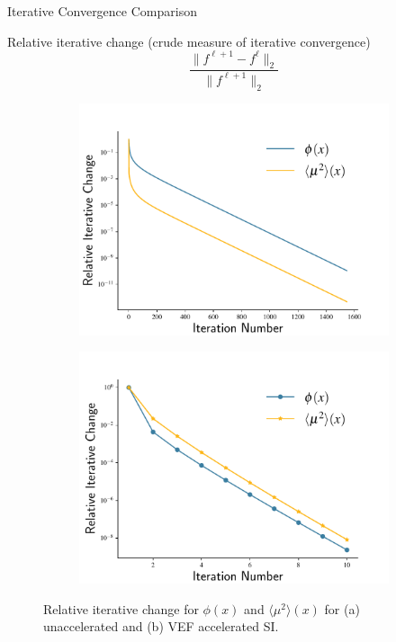 \documentclass[10pt]{beamer}
\newcommand{\edd}{\langle \mu^2 \rangle}
\begin{document}
\begin{frame}{Iterative Convergence Comparison}

	Relative iterative change (crude measure of iterative convergence)
	\begin{equation*}
		\frac{\| f^{\ell+1} - f^\ell \|_2}{\| f^{\ell+1} \|_2}
	\end{equation*}

	\vspace{-.2in}
	\begin{figure}[htb]
	\centering
	\begin{subfigure}{.515\textwidth}
		\centering
		\includegraphics[width=\textwidth]{figs/si.pdf}
		\caption{}
		\label{fig:si}
	\end{subfigure}
	\hspace{-2em}
	\begin{subfigure}{.515\textwidth}
		\centering
		\includegraphics[width=\textwidth]{figs/vef.pdf}  
		\caption{}
		\label{fig:vef}
	\end{subfigure}
	\caption{Relative iterative change for $\phi(x)$ and $\edd(x)$ for (a) unaccelerated and (b) VEF accelerated SI. }
	\end{figure}

\end{frame}
\end{document}
